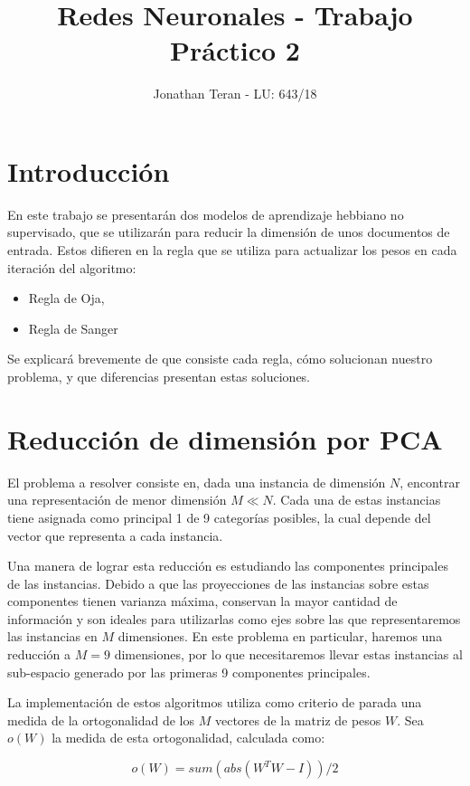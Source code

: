 \documentclass[a4paper,10pt]{article}
\author{Jonathan Teran - LU: 643/18}
\title{Redes Neuronales - Trabajo Práctico 2}
\date{}
\begin{document}
\maketitle

\section{Introducción}

En este trabajo se presentarán dos modelos de aprendizaje hebbiano no
supervisado, que se utilizarán para reducir la dimensión de unos documentos de
entrada. Estos difieren en la regla que se utiliza para actualizar los pesos
en cada iteración del algoritmo:

\begin{itemize}
	\item Regla de Oja,
	\item Regla de Sanger
\end{itemize}

Se explicará brevemente de que consiste cada regla, cómo solucionan nuestro
problema, y que diferencias presentan estas soluciones.

\section{Reducción de dimensión por PCA}

El problema a resolver consiste en, dada una instancia de dimensión $N$,
encontrar una representación de menor dimensión $M \ll N$. Cada una de estas
instancias tiene asignada como principal 1 de 9 categorías posibles, la cual
depende del vector que representa a cada instancia.

Una manera de lograr esta reducción es estudiando las componentes principales
de las instancias. Debido a que las proyecciones de las instancias sobre estas
componentes tienen varianza máxima, conservan la mayor cantidad de
información y son ideales para utilizarlas como ejes sobre las que
representaremos las instancias en $M$ dimensiones. En este problema en
particular, haremos una reducción a $M=9$ dimensiones, por lo que
necesitaremos llevar estas instancias al sub-espacio generado por las primeras
9 componentes principales.

La implementación de estos algoritmos utiliza como criterio de parada una
medida de la ortogonalidad de los $M$ vectores de la matriz de pesos $W$. Sea
$o(W)$ la medida de esta ortogonalidad, calculada como:

\[ o(W) = sum(abs(W^TW - I))/2 \]
\end{document}
